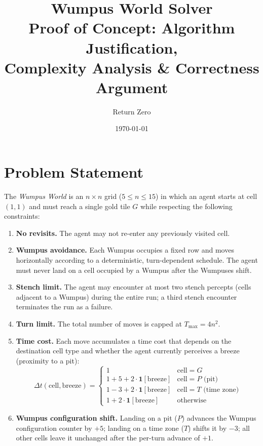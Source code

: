 \documentclass[12pt,a4paper]{article}
\title{%
  \textbf{Wumpus World Solver} \\[0.5em]
  \large Proof of Concept: Algorithm Justification, \\
  Complexity Analysis \& Correctness Argument
}
\author{Return Zero}
\date{\today}
\begin{document}
\maketitle
\tableofcontents
\newpage

\section{Problem Statement}

The \emph{Wumpus World} is an $n \times n$ grid ($5 \le n \le 15$) in which an
agent starts at cell $(1,1)$ and must reach a single gold tile $G$ while
respecting the following constraints:

\begin{enumerate}
  \item \textbf{No revisits.} The agent may not re-enter any previously visited
        cell.
  \item \textbf{Wumpus avoidance.} Each Wumpus occupies a fixed row and moves
        horizontally according to a deterministic, turn-dependent schedule.  The
        agent must never land on a cell occupied by a Wumpus after the Wumpuses
        shift.
  \item \textbf{Stench limit.} The agent may encounter at most two stench
        percepts (cells adjacent to a Wumpus) during the entire run; a third
        stench encounter terminates the run as a failure.
  \item \textbf{Turn limit.} The total number of moves is capped at
        $T_{\max} = 4n^2$.
  \item \textbf{Time cost.} Each move accumulates a time cost that depends on
        the destination cell type and whether the agent currently perceives a
        breeze (proximity to a pit):
        \[
          \Delta t(\text{cell}, \text{breeze}) =
          \begin{cases}
            1 & \text{cell} = G \\
            1 + 5 + 2\cdot\mathbf{1}[\text{breeze}] & \text{cell} = P \text{ (pit)} \\
            1 - 3 + 2\cdot\mathbf{1}[\text{breeze}] & \text{cell} = T \text{ (time zone)} \\
            1 + 2\cdot\mathbf{1}[\text{breeze}] & \text{otherwise}
          \end{cases}
        \]
  \item \textbf{Wumpus configuration shift.} Landing on a pit ($P$) advances
        the Wumpus configuration counter by $+5$; landing on a time zone ($T$)
        shifts it by $-3$; all other cells leave it unchanged after the
        per-turn advance of $+1$.
\end{enumerate}
\end{document}
